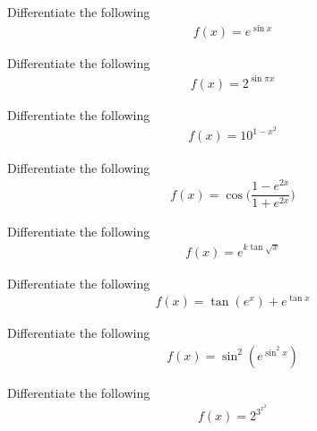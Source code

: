 \begin{exercise}
Differentiate the following
\begin{align*}
    f(x) = e^{\sin x}
\end{align*}
\end{exercise}

\begin{exercise}
Differentiate the following
\begin{align*}
    f(x) = 2^{\sin \pi x}
\end{align*}
\end{exercise}

\begin{exercise}
Differentiate the following
\begin{align*}
    f(x) = 10^{1-x^2}
\end{align*}
\end{exercise}

\begin{exercise}
Differentiate the following
\begin{align*}
    f(x) = \cos\Big(\dfrac{1-e^{2x}}{1+e^{2x}}\Big)
\end{align*}
\end{exercise}

\begin{exercise}
Differentiate the following
\begin{align*}
    f(x) = e^{k \tan \sqrt{x}}
\end{align*}
\end{exercise}

\begin{exercise}
Differentiate the following
\begin{align*}
    f(x) = \tan (e^{x}) + e^{\tan x}
\end{align*}
\end{exercise}

\begin{exercise}
Differentiate the following
\begin{align*}
    f(x) = \sin^{2} (e^{\sin^{2} x})
\end{align*}
\end{exercise}

\begin{exercise}
Differentiate the following
\begin{align*}
    f(x) = 2^{3^{x^{2}}}
\end{align*}
\end{exercise}

